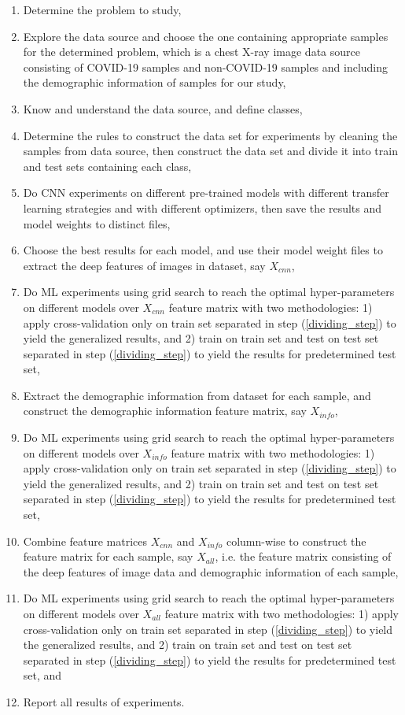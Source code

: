 \begin{enumerate}
	\item Determine the problem to study,
	\item Explore the data source and choose the one containing appropriate samples  for the determined problem, which is a chest X-ray image data source consisting of COVID-19 samples and non-COVID-19 samples and including the demographic information of samples for our study,
	\item Know and understand the data source, and define classes,
	\item Determine the rules to construct the data set for experiments by cleaning the samples from data source, then construct the data set and divide it into train and test sets containing each class, \label{dividing_step}
	\item Do CNN experiments on different pre-trained models with different transfer learning strategies and with different optimizers, then save the results and model weights to distinct files,
	\item Choose the best results for each model, and use their model weight files to extract the deep features of images in dataset, say $X_{cnn}$,
	\item Do ML experiments using grid search to reach the optimal hyper-parameters on different models over $X_{cnn}$ feature matrix with two methodologies: 1) apply cross-validation only on train set separated in step (\ref{dividing_step}) to yield the generalized results, and 2) train on train set and test on test set separated in step (\ref{dividing_step}) to yield the results for predetermined test set, \label{ML_experiment_step}
	\item Extract the demographic information from dataset for each sample, and construct the demographic information feature matrix, say $X_{info}$,
	\item Do ML experiments using grid search to reach the optimal hyper-parameters on different models over $X_{info}$ feature matrix with two methodologies: 1) apply cross-validation only on train set separated in step (\ref{dividing_step}) to yield the generalized results, and 2) train on train set and test on test set separated in step (\ref{dividing_step}) to yield the results for predetermined test set,
	\item Combine feature matrices $X_{cnn}$ and $X_{info}$ column-wise to construct the feature matrix for each sample, say $X_{all}$, i.e. the feature matrix consisting of the deep features of image data and demographic information of each sample,
	\item Do ML experiments using grid search to reach the optimal hyper-parameters on different models over $X_{all}$ feature matrix with two methodologies: 1) apply cross-validation only on train set separated in step (\ref{dividing_step}) to yield the generalized results, and 2) train on train set and test on test set separated in step (\ref{dividing_step}) to yield the results for predetermined test set, and
	\item Report all results of experiments.
\end{enumerate}

